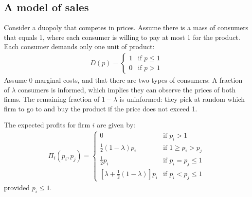 \subsection{A model of sales}
Consider a duopoly that competes in prices. Assume there is a mass of
consumers that equals 1, where each consumer is willing to pay at most
1 for the product. Each consumer demands only one unit of product:
\begin{align}
	D(p)=
	\begin{cases}
		1 & \text{if }p\leq1 \\
		0 & \text{if }p>1
	\end{cases}
\end{align}
Assume 0 marginal costs, and that there are two types of consumers:
A fraction of \(\lambda\) consumers is informed, which implies they can
observe the prices of both firms. The remaining fraction of \(1-\lambda\)
is uninformed: they pick at random which firm to go to and buy the
product if the price does not exceed 1.

The expected profits for firm \(i\) are given by:
\begin{align}
	\Pi_i(p_i,p_j)=
	\begin{cases}
		0                                                & \text{if }p_i>1         \\
		\frac{1}{2}(1-\lambda)p_i                        & \text{if }1\geq p_i>p_j \\
		\frac{1}{2}p_i                                   & \text{if }p_i=p_j\leq1  \\
		\left[\lambda+ \frac{1}{2}(1-\lambda) \right]p_i & \text{if }p_i<p_j\leq1
	\end{cases}
\end{align}
provided \(p_i\leq1\).

